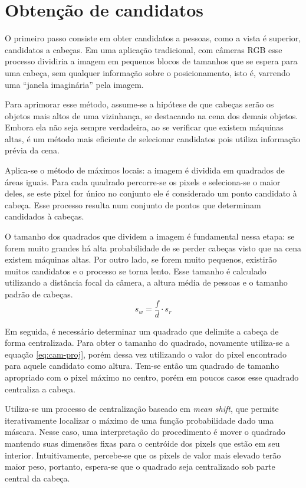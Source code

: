 \section{Obtenção de candidatos}
O primeiro passo consiste em obter candidatos a pessoas, como a vista é superior, candidatos a cabeças. Em uma aplicação tradicional, com câmeras RGB esse processo dividiria a imagem em pequenos blocos de tamanhos que se espera para uma cabeça, sem qualquer informação sobre o posicionamento, isto é, varrendo uma ``janela imaginária'' pela imagem.

Para aprimorar esse método, assume-se a hipótese de que cabeças serão os objetos mais altos de uma vizinhança, se destacando na cena dos demais objetos. Embora ela não seja sempre verdadeira, ao se verificar que existem máquinas altas, é um método mais eficiente de selecionar candidatos pois utiliza informação prévia da cena.

Aplica-se o método de máximos locais: a imagem é dividida em quadrados de áreas iguais. Para cada quadrado percorre-se os pixels e seleciona-se o maior deles, se este pixel for único no conjunto ele é considerado um ponto candidato à cabeça. Esse processo resulta num conjunto de pontos que determinam candidados à cabeças.

O tamanho dos quadrados que dividem a imagem é fundamental nessa etapa: se forem muito grandes há alta probabilidade de se perder cabeças visto que na cena existem máquinas altas. Por outro lado, se forem muito pequenos, existirão muitos candidatos e o processo se torna lento. Esse tamanho é calculado utilizando a distância focal da câmera, a altura média de pessoas e o tamanho padrão de cabeças.
\begin{equation}
	\label{eq:cam-proj}
	s_w = \frac{f}{d} \cdot s_r
\end{equation}

Em seguida, é necessário determinar um quadrado que delimite a cabeça de forma centralizada. Para obter o tamanho do quadrado, novamente utiliza-se a equação \eqref{eq:cam-proj}, porém dessa vez utilizando o valor do pixel encontrado para aquele candidato como altura. Tem-se então um quadrado de tamanho apropriado com o pixel máximo no centro, porém em poucos casos esse quadrado centraliza a cabeça.

Utiliza-se um processo de centralização baseado em \textit{mean shift}, que permite iterativamente localizar o máximo de uma função probabilidade dado uma máscara. Nesse caso, uma interpretação do procedimento é mover o quadrado mantendo suas dimensões fixas para o centróide dos pixels que estão em seu interior. Intuitivamente, percebe-se que os pixels de valor mais elevado terão maior peso, portanto, espera-se que o quadrado seja centralizado sob parte central da cabeça.

